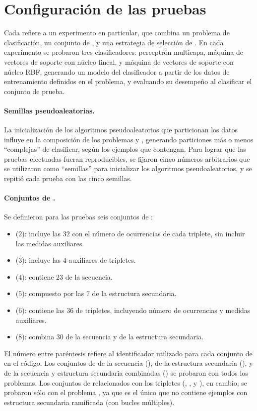 %
%
%
\section{Configuración de las pruebas}
%
Cada  refiere a un experimento en particular, que combina un
{problema} de clasificación, un {conjunto de }, y una
estrategia de selección de .
En cada experimento se probaron tres clasificadores: perceptrón
multicapa, máquina de vectores de soporte con núcleo lineal, y máquina
de vectores de soporte con núcleo RBF, generando un modelo del
clasificador a partir de los datos de entrenamiento definidos en el
problema, y evaluando su desempeño al clasificar el conjunto de
prueba.

\paragraph{Semillas pseudoaleatorias.}
La inicialización de los algoritmos pseudoaleatorios que particionan
los datos influye en la composición de los problemas \prob\mipred{} y
\prob\micropred{}, generando particiones más o menos ``complejas'' de
clasificar, según los ejemplos que contengan.
Para lograr que las pruebas efectuadas fueran reproducibles, se
fijaron cinco números arbitrarios que se utilizaron como ``semillas''
para inicializar los algoritmos pseudoaleatorios, y se repitió cada
prueba con las cinco semillas.

\paragraph{Conjuntos de .}
Se definieron para las pruebas seis conjuntos de :
%
\begin{itemize}
\item{} ($2$): incluye las $32$  con el número de
  ocurrencias de cada triplete, sin incluir las medidas auxiliares.
\item{} ($3$): incluye las $4$  auxiliares de
  tripletes.
\item{} ($4$): contiene $23$  de la secuencia.
\item{} ($5$): compuesto por las $7$  de la estructura
  secundaria.
\item{} ($6$): contiene las $36$  de tripletes,
  incluyendo número de ocurrencias y medidas auxiliares.
\item{} ($8$): combina $30$  de la secuencia y de la
  estructura secundaria.
\end{itemize}
%
El número entre paréntesis refiere al identificador utilizado para
cada conjunto de  en el código.
Los conjuntos de  de la secuencia (), de la
estructura secundaria (), y de la secuencia y estructura
secundaria combinadas () se probaron con todos los
problemas.
Los conjuntos de  relacionados con los tripletes (,
, y ), en cambio, se probaron sólo con el problema
\prob\tripletsvm{}, ya que es el único que no contiene ejemplos con
estructura secundaria ramificada (con bucles múltiples).
